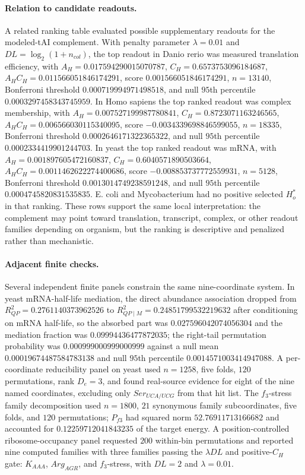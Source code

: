 \paragraph{Relation to candidate readouts.}
A related ranking table evaluated possible supplementary readouts for the modeled-tAI complement.  With penalty parameter $\lambda=0.01$ and $DL=\log_2(1+n_{col})$, the top readout in Danio rerio was measured translation efficiency, with $A_H=0.017594290015070787$, $C_H=0.6573753096184687$, $A_H C_H=0.011566051846174291$, score $0.001566051846174291$, $n=13140$, Bonferroni threshold $0.000719994971498518$, and null $95$th percentile $0.0003297458343745959$.  In Homo sapiens the top ranked readout was complex membership, with $A_H=0.007527199987780841$, $C_H=0.8723071163246565$, $A_H C_H=0.006566030115340095$, score $-0.0034339698846599055$, $n=18335$, Bonferroni threshold $0.0002646171322365322$, and null $95$th percentile $0.0002334419901244703$.  In yeast the top ranked readout was mRNA, with $A_H=0.001897605472160837$, $C_H=0.6040571890503664$, $A_H C_H=0.0011462622274400686$, score $-0.008853737772559931$, $n=5128$, Bonferroni threshold $0.0013014749238591248$, and null $95$th percentile $0.0004745820831535835$.  E. coli and Mycobacterium had no positive selected $H_o^*$ in that ranking.  These rows support the same local interpretation: the complement may point toward translation, transcript, complex, or other readout families depending on organism, but the ranking is descriptive and penalized rather than mechanistic.

\paragraph{Adjacent finite checks.}
Several independent finite panels constrain the same nine-coordinate system.  In yeast mRNA-half-life mediation, the direct abundance association dropped from $R^2_{QP}=0.2761140373962526$ to $R^2_{QP\mid M}=0.24851799532219632$ after conditioning on mRNA half-life, so the absorbed part was $0.027596042074056304$ and the mediation fraction was $0.09994436477872035$; the right-tail permutation probability was $0.000999000999000999$ against a null mean $0.00019674487584783138$ and null $95$th percentile $0.0014571003414947088$.  A per-coordinate reducibility panel on yeast used $n=1258$, five folds, $120$ permutations, rank $D_e=3$, and found real-source evidence for eight of the nine named coordinates, excluding only $Ser_{UCA/UCG}$ from that hit list.  The $f_3$-stress family decomposition used $n=1800$, $21$ synonymous family subcoordinates, five folds, and $120$ permutations; $P_{f3}$ had squared norm $52.76911713166682$ and accounted for $0.12259712041843235$ of the target energy.  A position-controlled ribosome-occupancy panel requested $200$ within-bin permutations and reported nine computed families with three families passing the $\lambda DL$ and positive-$C_H$ gate: $K_{AAA}$, $Arg_{AGR}$, and $f_3$-stress, with $DL=2$ and $\lambda=0.01$.

